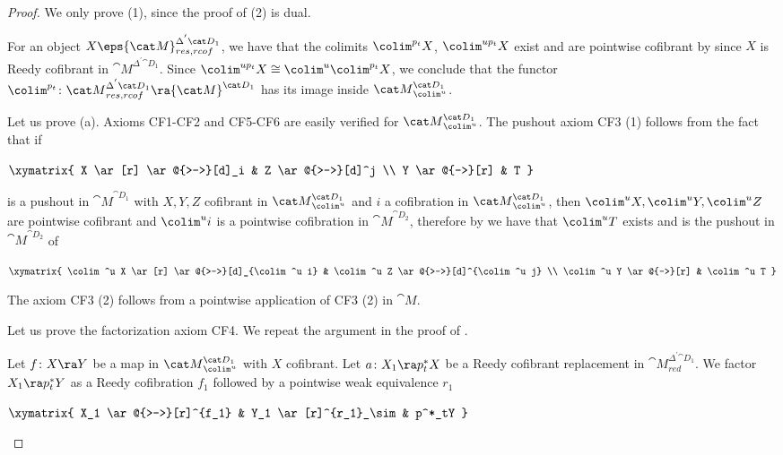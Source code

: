 \begin{proof}
We only prove (1), since the proof of (2) is dual.

For an object $X \eps {\cat M}^{\Delta^{'}{\cat D}_1}_{res, rcof}$, we have that the colimits $\colim^{p_t}X$, $\colim^{up_t}X$ exist and are pointwise cofibrant by  since $X$ is Reedy cofibrant in ${\cat M}^{\Delta^{'}{\cat D}_1}$. Since $\colim^{up_t}X \cong \colim^{u}\colim^{p_t}X$, we conclude that the functor $\colim^{p_t} \colon {\cat M}^{\Delta^{'}{\cat D}_1}_{res, rcof} \ra {\cat M}^{{\cat D}_1}$ has its image inside ${\cat M}^{{\cat D}_1}_{\colim^u}$.

Let us prove (a). Axioms CF1-CF2 and CF5-CF6 are easily verified for ${\cat M}^{{\cat D}_1}_{{\colim}^u}$. The pushout axiom CF3 (1) follows from the fact that if 
\begin{center}
$ \xymatrix {
	X \ar[r] \ar@{>->}[d]_i &
	Z \ar@{>-->}[d]^j \\
	Y \ar@{-->}[r] &
	T
	}$
\end{center}
is a pushout in ${\cat M}^{{\cat D}_1}$ with $X, Y, Z$ cofibrant in ${\cat M}^{{\cat D}_1}_{{\colim}^u}$ and $i$ a cofibration in ${\cat M}^{{\cat D}_1}_{{\colim}^u}$, then $\colim^u X, \colim^u Y, \colim^u Z$ are pointwise cofibrant and $\colim^u i$ is a pointwise cofibration in ${\cat M}^{{\cat D}_2}$, therefore by  we have that $\colim^uT$ exists and is the pushout in ${\cat M}^{{\cat D}_2}$ of
\begin{center}
$ \xymatrix {
	\colim^u X \ar[r] \ar@{>->}[d]_{\colim^u i} &
	\colim^u Z \ar@{>-->}[d]^{\colim^u j} \\
	\colim^u Y \ar@{-->}[r] &
	\colim^u T
	}$
\end{center}
The axiom CF3 (2) follows from a pointwise application of CF3 (2) in ${\cat M}$.

Let us prove the factorization axiom CF4. We repeat the argument in the proof of .

Let $f \colon X \ra Y$ be a map in ${\cat M}^{{\cat D}_1}_{{\colim}^u}$ with $X$ cofibrant. Let $a \colon X_1 \ra p_t^*X$ be a Reedy cofibrant replacement in ${\cat M}^{\Delta^{'}{\cat D}_1}_{red}$. We factor $X_1 \ra p^*_t Y$ as a Reedy cofibration $f_1$ followed by a pointwise weak equivalence $r_1$
\begin{center}
$\xymatrix {
    X_1 \ar@{>->}[r]^{f_1} & Y_1 \ar[r]^{r_1}_\sim & p^*_tY
  } $
\end{center}


\end{proof}
